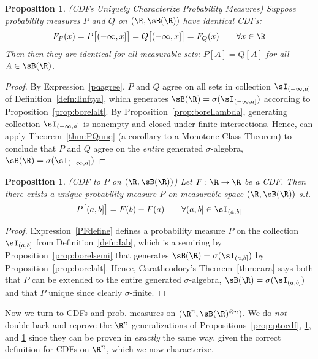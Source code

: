 \documentclass[12pt]{article}
\theoremstyle{plain}
\newtheorem{prop}[thm]{Proposition}
\theoremstyle{definition}
\theoremstyle{remark}
\newcommand{\ra}{\rightarrow}
\begin{document}
\begin{prop}\emph{(CDFs Uniquely Characterize Probability Measures)}
\label{prop:cdfunq}
Suppose probability measures $P$ and $Q$ on $(\R,\sB(\R))$ have
identical CDFs:
\begin{align}
  F_P(x)
  = P\big[(-\infty,x]\big]
  = Q\big[(-\infty,x]\big]
  =F_Q(x) \qquad \forall x\in\R
  \label{pqagree}
\end{align}
Then then they are identical for all measurable sets:
$P[A] = Q[A]$ for all $A \in \sB(\R)$.
\end{prop}
\begin{proof}
By Expression~\ref{pqagree}, $P$ and $Q$ agree on all sets in
collection $\sI_{(-\infty,a]}$ of Definition~\ref{defn:Iinftya},
which generates $\sB(\R)=\sigma(\sI_{(-\infty,a]})$ according to
Proposition~\ref{prop:borelalt}.  By
Proposition~\ref{prop:borellambda}, generating collection
$\sI_{(-\infty,a]}$ is nonempty and closed under finite intersections.
Hence, can apply Theorem~\ref{thm:PQunq} (a corollary to a Monotone
Class Theorem) to conclude that $P$ and $Q$ agree on the
\emph{entire} generated $\sigma$-algebra,
$\sB(\R)=\sigma(\sI_{(-\infty,a]})$
\end{proof}

\begin{prop}\emph{(CDF to $P$ on $(\R,\sB(\R))$)}
\label{prop:cdftop}
Let $F:\R\ra\R$ be a CDF. Then there \emph{exists a unique} probability
measure $P$ on measurable space $(\R,\sB(\R))$ s.t.
\begin{align}
  P\big[(a,b]\big] = F(b)-F(a)
  \qquad \forall (a,b]\in\sI_{(a,b]}
  \label{PFdefine}
\end{align}
\end{prop}
\begin{proof}
Expression~\ref{PFdefine} defines a probability measure $P$ on the
collection $\sI_{(a,b]}$ from Definition~\ref{defn:Iab}, which is a
semiring by Proposition~\ref{prop:borelsemi} that generates
$\sB(\R)=\sigma(\sI_{(a,b]})$ by Proposition~\ref{prop:borelalt}.
Hence, Caratheodory's Theorem~\ref{thm:cara} says both that $P$ can be
extended to the entire generated $\sigma$-algebra,
$\sB(\R)=\sigma(\sI_{(a,b]})$ and that $P$ unique since clearly
$\sigma$-finite.
\end{proof}



Now we turn to CDFs and prob. measures on
$(\R^n,\sB(\R)^{\otimes n})$. We do \emph{not} double back and reprove
the $\R^n$ generalizations of Propositions~\ref{prop:ptocdf},
\ref{prop:cdfunq}, and \ref{prop:cdftop} since they can be proven in
\emph{exactly} the same way, given the correct definition for CDFs on
$\R^n$, which we now characterize.
\end{document}
